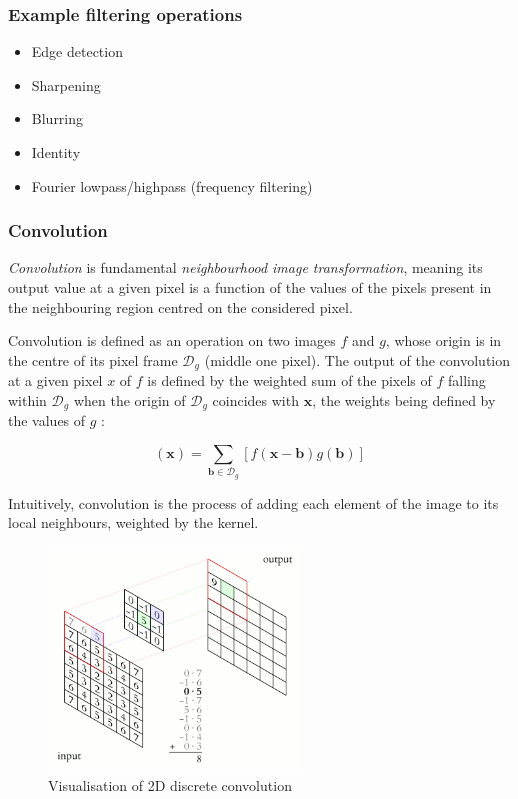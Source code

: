 \subsubsection{Example filtering operations}

\begin{itemize}
    \item Edge detection
    \item Sharpening
    \item Blurring
    \item Identity
    \item Fourier lowpass/highpass (frequency filtering)
\end{itemize}

\subsubsection{Convolution}

\emph{Convolution} is fundamental \emph{neighbourhood image transformation}, meaning its output value at a given pixel is a function of the values of the pixels present in the neighbouring region centred on the considered pixel.

Convolution is defined as an operation on two images $f$ and $g$, whose origin is in the centre of its pixel frame $\mathcal{D}_g$ (middle one pixel). The output of the convolution at a given pixel $x$ of $f$ is defined by the weighted sum of the pixels of $f$ falling within $\mathcal{D}_g$ when the origin of $\mathcal{D}_g$ coincides with $\mathbf{x}$, the weights being defined by the values of $g$ \cite{morphology_book}:

\begin{equation}
    [f*g](\mathbf{x}) = \sum_{\mathbf{b} \in \mathcal{D}_g} [f(\mathbf{x} - \mathbf{b}) g (\mathbf{b})]
\end{equation}

Intuitively, convolution is the process of adding each element of the image to its local neighbours, weighted by the kernel.

\begin{figure}[H]
    \centering
    \includegraphics[width=0.6\textwidth]{Content/Images/2D_Convolution_Animation.png}
    \caption{Visualisation of 2D discrete convolution \cite{convolution_animation}}
\end{figure}

